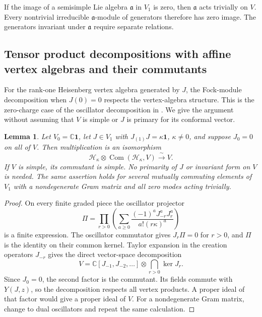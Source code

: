 \documentclass[11pt,a4paper]{amsart}
\numberwithin{equation}{section}
\newtheorem{lemma}[theorem]{Lemma}
\theoremstyle{definition}
\theoremstyle{remark}
\newcommand{\C}{\mathbb C}
\newcommand{\Com}{\operatorname{Com}}
\begin{document}
If the image of a semisimple Lie algebra $\mathfrak a$ in $V_1$ is zero,
then $\mathfrak a$ acts trivially on $V$. Every nontrivial irreducible
$\mathfrak a$-module of generators therefore has zero image.
The generators invariant under $\mathfrak a$ require separate relations.

\subsection{Tensor product decompositions with affine vertex algebras and their commutants}
For the rank-one Heisenberg vertex algebra generated by $J$, the
Fock-module decomposition when $J(0)=0$ respects the vertex-algebra
structure. This is the zero-charge case of the oscillator decomposition
in \cite[Section~3.1, (3.3) and Proposition~3.2]{CKLRHeisenberg2019}.
We give the argument without assuming that $V$ is simple or $J$ is
primary for its conformal vector.

\begin{lemma}\label{com:heisenberg}
Let $V_0=\C\mathbf1$, let $J\in V_1$ with
$J_{(1)}J=\kappa\mathbf1$, $\kappa\ne0$, and suppose $J_0=0$
on all of $V$. Then multiplication is an isomorphism
$$
       \mathcal H_\kappa\otimes\Com(\mathcal H_\kappa,V)
                  \xrightarrow{\ \sim\ } V.
$$
If $V$ is simple, its commutant is simple. No primarity of $J$
or invariant form on $V$ is needed. The same assertion holds for
several mutually commuting elements of $V_1$ with a nondegenerate Gram matrix and all zero
modes acting trivially.
\end{lemma}
\begin{proof}
On every finite graded piece the oscillator projector
\begin{equation}\label{com:oscillator-projector}
 \Pi=\prod_{r>0}\left(
   \sum_{a\ge0}\frac{(-1)^aJ_{-r}^{a}J_r^{a}}
                         {a!(r\kappa)^a}\right)
\end{equation}
is a finite expression. The oscillator commutator gives
$J_r\Pi=0$ for $r>0$, and $\Pi$ is the identity on their common
kernel. Taylor expansion in the creation operators $J_{-r}$
gives the direct vector-space decomposition
$$
 V=\C[J_{-1},J_{-2},\ldots]\otimes\bigcap_{r>0}\ker J_r.
$$
Since $J_0=0$, the second factor is the commutant. Its fields
commute with $Y(J,z)$, so the decomposition respects
all vertex products. A proper ideal of that factor would give a
proper ideal of $V$. For a nondegenerate Gram matrix, change to
dual oscillators and repeat the same calculation.
\end{proof}
\end{document}
